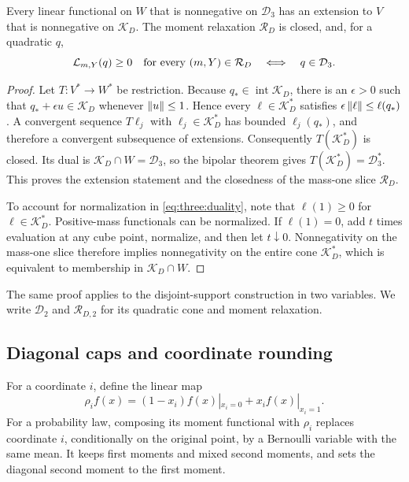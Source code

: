 \begin{proposition}\label{three:extension}
Every linear functional on $W$ that is nonnegative on $\mathcal D_3$ has an
extension to $V$ that is nonnegative on $\mathcal K_D$. The moment relaxation $\mathcal R_D$
is closed, and, for a quadratic $q$,
\begin{equation}\label{eq:three:duality}
 \mathcal L_{m,Y}(q)\ge0\quad\hbox{for every }(m,Y)\in \mathcal R_D
 \quad\Longleftrightarrow\quad q\in \mathcal D_3.
\end{equation}
\end{proposition}
\begin{proof}
Let $T:V^*\to W^*$ be restriction. Because $q_*\in\operatorname{int}\mathcal K_D$,
there is an $\epsilon>0$ such that $q_*+\epsilon u\in \mathcal K_D$ whenever
$\left\lVert u\right\rVert\le1$. Hence every $\ell\in \mathcal K_D^*$ satisfies
$\epsilon\left\lVert \ell\right\rVert\le\ell(q_*)$. A convergent sequence $T\ell_j$ with
$\ell_j\in \mathcal K_D^*$ has bounded $\ell_j(q_*)$, and therefore a convergent
subsequence of extensions. Consequently $T(\mathcal K_D^*)$ is closed. Its dual is
$\mathcal K_D\cap W=\mathcal D_3$, so the bipolar theorem gives
$T(\mathcal K_D^*)=\mathcal D_3^*$. This proves the extension statement and the closedness of
the mass-one slice $\mathcal R_D$.

To account for normalization in \eqref{eq:three:duality}, note that
$\ell(1)\ge0$ for $\ell\in \mathcal K_D^*$. Positive-mass functionals can be
normalized. If $\ell(1)=0$, add $t$ times evaluation at any cube point,
normalize, and then let $t\downarrow0$. Nonnegativity on the mass-one
slice therefore implies nonnegativity on the entire cone $\mathcal K_D^*$, which
is equivalent to membership in $\mathcal K_D\cap W$.
\end{proof}

The same proof applies to the disjoint-support construction in two
variables. We write $\mathcal D_2$ and $\mathcal R_{D,2}$ for its quadratic cone and moment
relaxation.

\subsection{Diagonal caps and coordinate rounding}

For a coordinate $i$, define the linear map
\begin{equation}\label{eq:three:rounding}
 \rho_i f(x)=(1-x_i)f(x)|_{x_i=0}+x_if(x)|_{x_i=1}.
\end{equation}
For a probability law, composing its moment functional with $\rho_i$
replaces coordinate $i$, conditionally on the original point, by a
Bernoulli variable with the same mean. It keeps first moments and mixed
second moments, and sets the diagonal second moment to the first moment.

